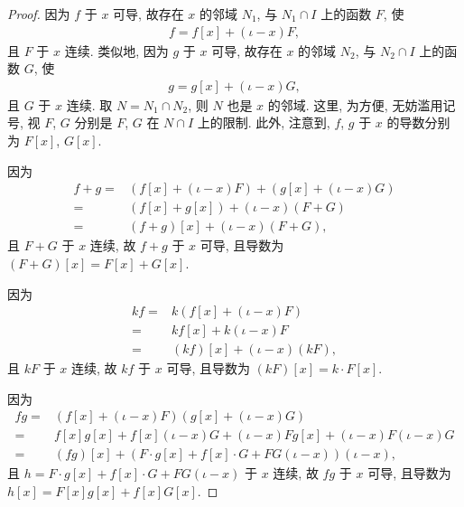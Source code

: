 \begin{proof}
    因为 $f$ 于 $x$ 可导, 故存在 $x$ 的邻域 $N_1$, 与 $N_1 \cap I$ 上的函数 $F$, 使
    \begin{align*}
        f = f[x] + (\iota - x)F,
    \end{align*}
    且 $F$ 于 $x$ 连续. 类似地, 因为 $g$ 于 $x$ 可导, 故存在 $x$ 的邻域 $N_2$, 与 $N_2 \cap I$ 上的函数 $G$, 使
    \begin{align*}
        g = g[x] + (\iota - x)G,
    \end{align*}
    且 $G$ 于 $x$ 连续. 取 $N = N_1 \cap N_2$, 则 $N$ 也是 $x$ 的邻域. 这里, 为方便, 无妨滥用记号, 视 $F$, $G$ 分别是 $F$, $G$ 在 $N \cap I$ 上的限制. 此外, 注意到, $f$, $g$ 于 $x$ 的导数分别为 $F[x]$, $G[x]$.

    因为
    \begin{align*}
        f + g
        = {} & (f[x] + (\iota - x)F) + (g[x] + (\iota - x)G) \\
        = {} & (f[x] + g[x]) + (\iota - x)(F + G)            \\
        = {} & (f + g)[x] + (\iota - x)(F + G),
    \end{align*}
    且 $F + G$ 于 $x$ 连续, 故 $f + g$ 于 $x$ 可导, 且导数为 $(F + G)[x] = F[x] + G[x]$.

    因为
    \begin{align*}
        kf
        = {} & k(f[x] + (\iota - x)F)     \\
        = {} & kf[x] + k(\iota - x)F      \\
        = {} & (kf)[x] + (\iota - x)(kF),
    \end{align*}
    且 $kF$ 于 $x$ 连续, 故 $kf$ 于 $x$ 可导, 且导数为 $(kF)[x] = k \cdot F[x]$.

    因为
    \begin{align*}
        fg
        = {} & (f[x] + (\iota - x)F)(g[x] + (\iota - x)G)                                \\
        = {} & f[x]g[x] + f[x](\iota - x)G + (\iota - x)Fg[x] + (\iota - x)F(\iota - x)G \\
        = {} & (fg)[x] + (F \cdot g[x] + f[x] \cdot G + FG(\iota - x))(\iota - x),
    \end{align*}
    且 $h = F \cdot g[x] + f[x] \cdot G + FG(\iota - x)$ 于 $x$ 连续, 故 $fg$ 于 $x$ 可导, 且导数为 $h[x] = F[x]g[x] + f[x]G[x]$.


\end{proof}
